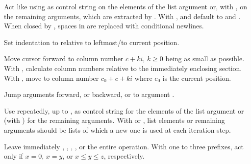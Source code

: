 \begin{LIST}{1cm}
\begin{LIST}{.5cm}
    {%
      Act like  using  as 
      control string on the elements of the list argument or, with ,
      on the remaining arguments, which are extracted by
      . With \KWD{:},  and 
      default to \LIT{(} and \LIT{)}. When closed by
      , spaces in  are replaced with
      conditional newlines. 
    }

    {%
      Set indentation to  relative to leftmost/to current
      position. 
    }

    {%
      Move cursor forward to column number $c + ki$, $k \geq 0$ being as small
      as possible. With \kwd{:}, calculate column numbers relative to
      the immediately enclosing section. With , move to column
      number $c_0 + c + ki$ where $c_0$ is the current position.
    }

    {%
      Jump  arguments forward, or backward, or to argument .
    }

    {%
      Use  repeatedly, up to , as control
      string for the elements of the list argument or (with
      ) for the remaining arguments. With \kwd{:} or ,
      list elements or remaining arguments should be
      lists of which a new one is used at each iteration step.
    }

    {%
      Leave immediately \kwd{\TLD\boldmath{$<$} \TLD\boldmath{$>$}},
      \kwd{\TLD\boldmath{$<$} \TLD:\boldmath{$>$}}, 
      \kwd{\TLD\boldmath{$\{$} \TLD\boldmath{$\}$}}, , or the
      entire  operation. With one to three prefixes, act only
      if $x=0$, $x=y$, or $x\leq y \leq z$, respectively.
    }


\end{LIST}
\end{LIST}
